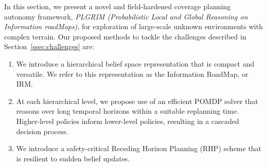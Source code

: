 \documentclass[letterpaper]{article} %
\newcommand{\phdone}[1]{} %
\begin{document}
\phdone{Framework Overview}
In this section, we present a novel and field-hardened coverage planning autonomy framework, \textit{PLGRIM (Probabilistic Local and Global Reasoning on Information roadMaps)}, for exploration of large-scale unknown environments with complex terrain.
Our proposed methods to tackle the challenges described in Section~\ref{ssec:challenges} are:


\vspace{-4pt}
\begin{enumerate}[label={\arabic*)}]
  \itemsep0em 
  \setlength{\itemsep}{0pt}
  \setlength{\parskip}{0pt}
  \item \label{en:idea1} We introduce a hierarchical belief space representation that is compact and versatile. We refer to this representation as the Information RoadMap, or IRM. 
  \item \label{en:idea2} At each hierarchical level, we propose use of an efficient POMDP solver that reasons over long temporal horizons within a suitable replanning time. Higher-level policies inform lower-level policies, resulting in a cascaded decision process.
  \item \label{en:idea4} We introduce a safety-critical Receding Horizon Planning (RHP) scheme that is resilient to sudden belief updates.    
\end{enumerate}
\vspace{-1pt}

\end{document}
